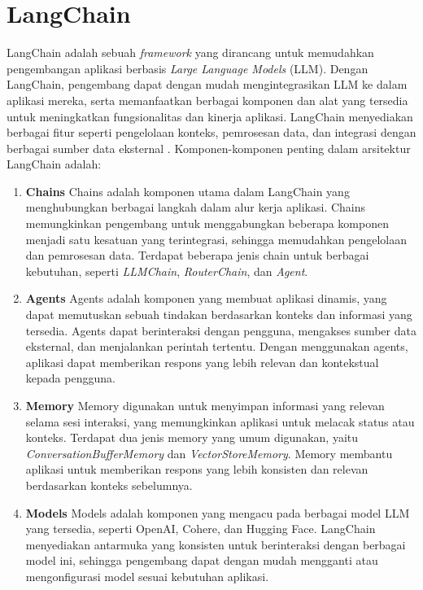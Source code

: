 \section{LangChain}
\label{sec:langchain}

LangChain adalah sebuah \textit{framework} yang dirancang untuk memudahkan pengembangan aplikasi berbasis \textit{Large Language Models} (LLM). Dengan LangChain, pengembang dapat dengan mudah mengintegrasikan LLM ke dalam aplikasi mereka, serta memanfaatkan berbagai komponen dan alat yang tersedia untuk meningkatkan fungsionalitas dan kinerja aplikasi. LangChain menyediakan berbagai fitur seperti pengelolaan konteks, pemrosesan data, dan integrasi dengan berbagai sumber data eksternal \parencite{IBM2023LangChain}. Komponen-komponen penting dalam arsitektur LangChain adalah:

\begin{enumerate}
	\item \textbf{Chains} \newline
	      Chains adalah komponen utama dalam LangChain yang menghubungkan berbagai langkah dalam alur kerja aplikasi. Chains memungkinkan pengembang untuk menggabungkan beberapa komponen menjadi satu kesatuan yang terintegrasi, sehingga memudahkan pengelolaan dan pemrosesan data. Terdapat beberapa jenis chain untuk berbagai kebutuhan, seperti \textit{LLMChain}, \textit{RouterChain}, dan \textit{Agent}.

	\item \textbf{Agents} \newline
	      Agents adalah komponen yang membuat aplikasi dinamis, yang dapat memutuskan sebuah tindakan berdasarkan konteks dan informasi yang tersedia. Agents dapat berinteraksi dengan pengguna, mengakses sumber data eksternal, dan menjalankan perintah tertentu. Dengan menggunakan agents, aplikasi dapat memberikan respons yang lebih relevan dan kontekstual kepada pengguna.

	\item \textbf{Memory} \newline
	      Memory digunakan untuk menyimpan informasi yang relevan selama sesi interaksi, yang memungkinkan aplikasi untuk melacak status atau konteks. Terdapat dua jenis memory yang umum digunakan, yaitu \textit{ConversationBufferMemory} dan \textit{VectorStoreMemory}. Memory membantu aplikasi untuk memberikan respons yang lebih konsisten dan relevan berdasarkan konteks sebelumnya.

	\item \textbf{Models} \newline
	      Models adalah komponen yang mengacu pada berbagai model LLM yang tersedia, seperti OpenAI, Cohere, dan Hugging Face. LangChain menyediakan antarmuka yang konsisten untuk berinteraksi dengan berbagai model ini, sehingga pengembang dapat dengan mudah mengganti atau mengonfigurasi model sesuai kebutuhan aplikasi.


\end{enumerate}
